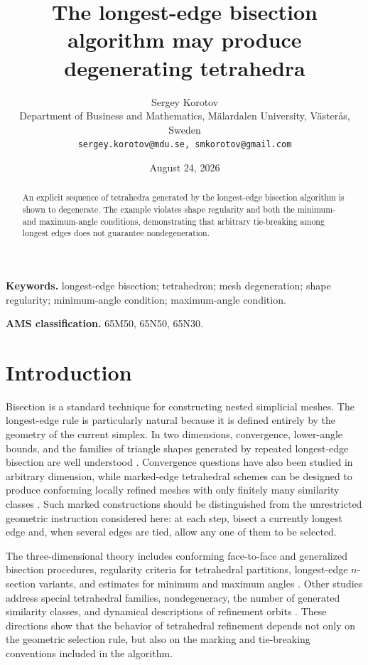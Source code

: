 \documentclass[10pt]{article}
\title{The longest-edge bisection algorithm may produce degenerating tetrahedra}
\author{Sergey Korotov\\[-1pt]
\small Department of Business and Mathematics, M\"alardalen University, V\"aster\aa s, Sweden\\[-2pt]
\small \texttt{sergey.korotov@mdu.se, smkorotov@gmail.com}}
\date{August 24, 2026}
\theoremstyle{definition}
\begin{document}
\maketitle

\begin{abstract}
An explicit sequence of tetrahedra generated by the longest-edge bisection algorithm is shown to degenerate.  The example violates shape regularity and both the minimum- and maximum-angle conditions, demonstrating that arbitrary tie-breaking among longest edges does not guarantee nondegeneration.
\end{abstract}

\noindent\textbf{Keywords.} longest-edge bisection; tetrahedron; mesh degeneration; shape regularity; minimum-angle condition; maximum-angle condition.

\noindent\textbf{AMS classification.} 65M50, 65N50, 65N30.

\section{Introduction}

Bisection is a standard technique for constructing nested simplicial meshes.  The longest-edge rule is particularly natural because it is defined entirely by the geometry of the current simplex.  In two dimensions, convergence, lower-angle bounds, and the families of triangle shapes generated by repeated longest-edge bisection are well understood \cite{RosenbergStenger1975,Stynes1979,Stynes1980,Adler1983}.  Convergence questions have also been studied in arbitrary dimension, while marked-edge tetrahedral schemes can be designed to produce conforming locally refined meshes with only finitely many similarity classes \cite{Kearfott1978,ArnoldMukherjeePouly2000}.  Such marked constructions should be distinguished from the unrestricted geometric instruction considered here: at each step, bisect a currently longest edge and, when several edges are tied, allow any one of them to be selected.

The three-dimensional theory includes conforming face-to-face and generalized bisection procedures, regularity criteria for tetrahedral partitions, longest-edge $n$-section variants, and estimates for minimum and maximum angles \cite{KorotovKrizekKropac2008,HannukainenKorotovKrizek2010a,HannukainenKorotovKrizek2010b,HannukainenKorotovKrizek2014,KorotovPlazaSuarez2015,KorotovPlazaSuarez2016,KorotovPlazaSuarezMoreno2019,KorotovLundVatne2021}.  Other studies address special tetrahedral families, nondegeneracy, the number of generated similarity classes, and dynamical descriptions of refinement orbits \cite{PlazaPadronSuarezFalcon2004,PlazaPadronSuarez2005,PerdomoPlaza2014,SuarezTrujilloMoreno2021,PadronPlazaSuarez2023,TrujilloSuarezPadron2024,PadronTrujilloSuarez2025,MichaudKorotov2026a,MichaudKorotov2026b,MichaudKorotov2026c}.  These directions show that the behavior of tetrahedral refinement depends not only on the geometric selection rule, but also on the marking and tie-breaking conventions included in the algorithm.
\end{document}
